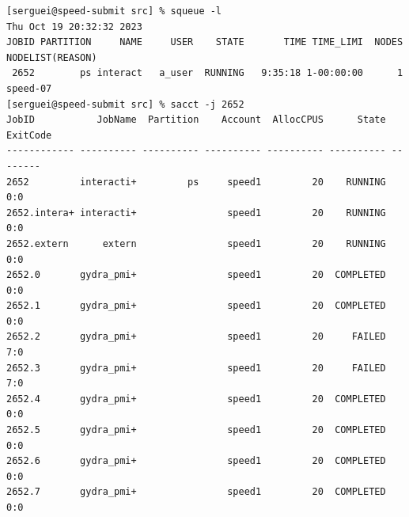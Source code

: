 \small
\begin{verbatim}
[serguei@speed-submit src] % squeue -l
Thu Oct 19 20:32:32 2023
JOBID PARTITION     NAME     USER    STATE       TIME TIME_LIMI  NODES NODELIST(REASON)
 2652        ps interact   a_user  RUNNING   9:35:18 1-00:00:00      1 speed-07
[serguei@speed-submit src] % sacct -j 2652
JobID           JobName  Partition    Account  AllocCPUS      State ExitCode
------------ ---------- ---------- ---------- ---------- ---------- --------
2652         interacti+         ps     speed1         20    RUNNING      0:0
2652.intera+ interacti+                speed1         20    RUNNING      0:0
2652.extern      extern                speed1         20    RUNNING      0:0
2652.0       gydra_pmi+                speed1         20  COMPLETED      0:0
2652.1       gydra_pmi+                speed1         20  COMPLETED      0:0
2652.2       gydra_pmi+                speed1         20     FAILED      7:0
2652.3       gydra_pmi+                speed1         20     FAILED      7:0
2652.4       gydra_pmi+                speed1         20  COMPLETED      0:0
2652.5       gydra_pmi+                speed1         20  COMPLETED      0:0
2652.6       gydra_pmi+                speed1         20  COMPLETED      0:0
2652.7       gydra_pmi+                speed1         20  COMPLETED      0:0
\end{verbatim}
\normalsize

